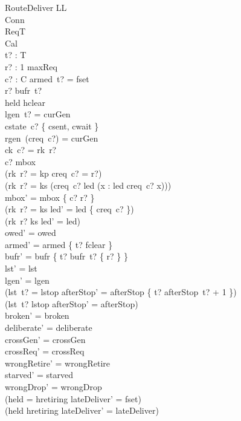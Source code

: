\documentclass[a4paper,10pt,fleqn]{article}
\begin{document}
\begin{schema}{RouteDeliver}
  \Delta LL \\
  \Xi Conn \\
  \Xi ReqT \\
  \Xi Cal \\
  t? : T \\
  r? : 1 \upto maxReq \\
  c? : C
\where
  armed~t? = fset \\
  r? \in bufr~t? \\
  held \neq hclear \\
  lgen~t? = curGen \\
  cstate~c? \in \{ csent, cwait \} \\
  rgen~(creq~c?) = curGen \\
  ck~c? = rk~r? \\
  c? \notin \dom mbox \\
  (rk~r? = kp \implies creq~c? = r?) \\
  (rk~r? = ks \implies
    (creq~c? \in led \land (\forall x : led \spot creq~c? \leq x))) \\
  mbox' = mbox \cup \{ c? \mapsto r? \} \\
  (rk~r? = ks \implies led' = led \setminus \{ creq~c? \}) \\
  (rk~r? \neq ks \implies led' = led) \\
  owed' = owed \\
  armed' = armed \oplus \{ t? \mapsto fclear \} \\
  bufr' = bufr \oplus \{ t? \mapsto bufr~t? \setminus \{ r? \} \} \\
  lst' = lst \\
  lgen' = lgen \\
  (lst~t? = lstop \implies
    afterStop' = afterStop \oplus \{ t? \mapsto afterStop~t? + 1 \}) \\
  (lst~t? \neq lstop \implies afterStop' = afterStop) \\
  broken' = broken \\
  deliberate' = deliberate \\
  crossGen' = crossGen \\
  crossReq' = crossReq \\
  wrongRetire' = wrongRetire \\
  starved' = starved \\
  wrongDrop' = wrongDrop \\
  (held = hretiring \implies lateDeliver' = fset) \\
  (held \neq hretiring \implies lateDeliver' = lateDeliver)
\end{schema}
\end{document}
